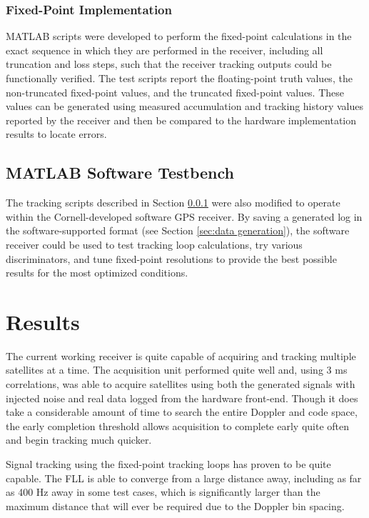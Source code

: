 \documentclass[12pt]{article}
\begin{document}
\subsubsection{Fixed-Point Implementation}
\label{sec:fixed-point implementation}
MATLAB scripts were developed to perform the fixed-point calculations in the exact sequence in which they are performed in the receiver, including all truncation and loss steps, such that the receiver tracking outputs could be functionally verified. The test scripts report the floating-point truth values, the non-truncated fixed-point values, and the truncated fixed-point values. These values can be generated using measured accumulation and tracking history values reported by the receiver and then be compared to the hardware implementation results to locate errors.

\subsection{MATLAB Software Testbench}
The tracking scripts described in Section \ref{sec:fixed-point implementation} were also modified to operate within the Cornell-developed software GPS receiver. By saving a generated log in the software-supported format (see Section \ref{sec:data generation}), the software receiver could be used to test tracking loop calculations, try various discriminators, and tune fixed-point resolutions to provide the best possible results for the most optimized conditions.

\section{Results}
The current working receiver is quite capable of acquiring and tracking multiple satellites at a time. The acquisition unit performed quite well and, using 3 ms correlations, was able to acquire satellites using both the generated signals with injected noise and real data logged from the hardware front-end. Though it does take a considerable amount of time to search the entire Doppler and code space, the early completion threshold allows acquisition to complete early quite often and begin tracking much quicker.

Signal tracking using the fixed-point tracking loops has proven to be quite capable. The FLL is able to converge from a large distance away, including as far as 400 Hz away in some test cases, which is significantly larger than the maximum distance that will ever be required due to the Doppler bin spacing.
\end{document}
